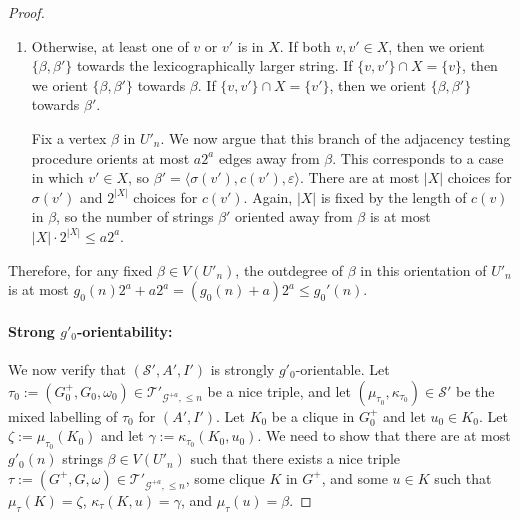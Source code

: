 \documentclass{patmorin}
\renewcommand{\le}{\leqslant}
\renewcommand{\leq}{\leqslant}
\newcommand{\calG}{\mathcal{G}}
\newcommand{\calS}{\mathcal{S}}
\newcommand{\calT}{\mathcal{T}}
\begin{document}
\begin{proof}
\begin{enumerate}
    Fix a vertex $\beta$ in $U'_n$.
    We now argue that this branch of the adjacency testing procedure orients at most $g_0(n)\cdot 2^a$ edges away from $\beta$, over all choices of $\beta'$.  The bitstring $\beta$ determines the label $\mu(v)=\langle \sigma(v),c(v),\mu^-(v)\rangle$. Importantly, $c(v)$ is a bit-vector of length exactly $|X|$, so $\beta$ strictly fixes $|X|$. Each edge oriented away from $\beta$ by this branch of the adjacency testing procedure corresponds to an edge oriented away from $\mu^-(v)$ in $U_n$.    Since $\beta$ includes $\mu^-(v)$, there are at most $g_0(n)$ choices of $\mu^-(v')$ that result in an edge being oriented away from $\beta$ in this way.  Since $v'\not\in X$, $\sigma(v')$ is a sequence of $0$s of length $\lceil \log (|X|+1)\rceil$, and $c(v')$ is a bit-vector of length $|X|$, leaving $2^{|X|}$ choices for $c(v')$.  Thus, the number of possible strings $\beta'=\langle \sigma(v'),c(v'),\mu^-(v')\rangle$ for which the edge $\{\beta,\beta'\}$ is oriented away from $\beta$ by this branch of the adjacency testing procedure is at most $g_0(n) 2^{|X|} \leq g_0(n) 2^{a}$.

    \item Otherwise, at least one of $v$ or $v'$ is in $X$.  If both $v,v'\in X$, then we orient $\{\beta,\beta'\}$ towards the lexicographically larger string.  If $\{v,v'\}\cap X=\{v\}$, then we orient $\{\beta,\beta'\}$ towards $\beta$. If $\{v,v'\}\cap X=\{v'\}$, then we orient $\{\beta,\beta'\}$ towards $\beta'$.

    Fix a vertex $\beta$ in $U'_n$.  We now argue that this branch of the adjacency testing procedure orients at most $a 2^{a}$ edges away from $\beta$. This corresponds to a case in which $v'\in X$, so $\beta'=\langle \sigma(v'),c(v'),\varepsilon\rangle$. There are at most $|X|$ choices for $\sigma(v')$ and $2^{|X|}$ choices for $c(v')$. Again, $|X|$ is fixed by the length of $c(v)$ in $\beta$, so the number of strings $\beta'$ oriented away from $\beta$ is at most $|X|\cdot 2^{|X|} \leq a 2^{a}$.
  \end{enumerate}
  Therefore, for any fixed $\beta\in V(U'_n)$, the outdegree of $\beta$ in this orientation of $U'_n$ is at most $g_0(n) 2^{a} + a 2^{a} = (g_0(n)+a)2^{a} \leq g_0'(n)$.

  \paragraph{\boldmath Strong $g'_0$-orientability:}  We now verify that $(\calS',A',I')$ is strongly $g'_0$-orientable.
  Let $\tau_0 := (G_0^+, G_0, \omega_0) \in \calT'_{\calG^{+a}, \le n}$ be a nice triple, and let $(\mu_{\tau_0},\kappa_{\tau_0})\in\calS'$ be the mixed labelling of $\tau_0$ for $(A',I')$. Let $K_0$ be a clique in $G_0^+$ and let $u_0\in K_0$. Let $\zeta:=\mu_{\tau_0}(K_0)$ and let $\gamma:=\kappa_{\tau_0}(K_0,u_0)$. We need to show that there are at most $g'_0(n)$ strings $\beta\in V(U'_n)$ such that there exists a nice triple $\tau:=(G^+,G,\omega) \in \calT'_{\calG^{+a},\le n}$, some clique $K$ in $G^+$, and some $u\in K$ such that $\mu_\tau(K)=\zeta$, $\kappa_\tau(K,u)=\gamma$, and $\mu_\tau(u)=\beta$.


\end{proof}
\end{document}
